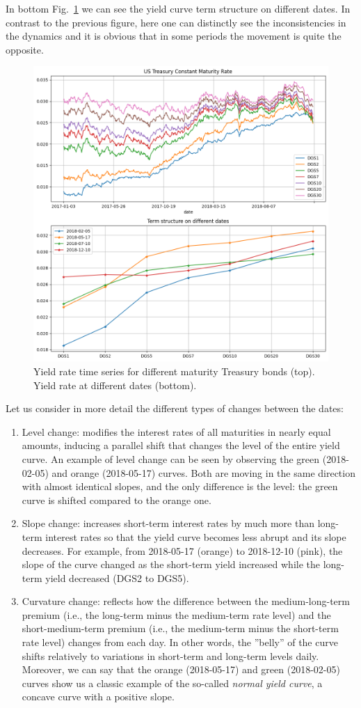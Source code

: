 In bottom Fig.~\ref{fig:yield_rate_ts} we can see the yield curve term structure on different dates. In contrast to the previous figure, here one can distinctly see the inconsistencies in the dynamics and it is obvious that in some periods the movement is quite the opposite.

\begin{figure}[htbp]
	\centering
	\includegraphics[width=0.7\linewidth]{figures/treasury_rate}
	\caption{Yield rate time series for different maturity Treasury bonds (top). Yield rate at different dates (bottom).}
	\label{fig:yield_rate_ts}
\end{figure}

Let us consider in more detail the different types of changes between the dates:
\begin{enumerate}
\item Level change: modifies the interest rates of all maturities in nearly equal amounts, inducing a parallel shift that changes the level of the entire yield curve. An example of level change can be seen by observing the green (2018-02-05) and orange (2018-05-17) curves. Both are moving in the same direction with almost identical slopes, and the only difference is the level: the green curve is shifted compared to the orange one.
\item Slope change: increases short-term interest rates by much more than long-term interest rates so that the yield curve becomes less abrupt and its slope decreases.
For example, from 2018-05-17 (orange) to 2018-12-10 (pink), the slope of the curve changed as the short-term yield increased while the long-term yield decreased (DGS2 to DGS5).
\item Curvature change: reflects how the difference between the medium-long-term premium (i.e., the long-term minus the medium-term rate level) and the short-medium-term premium (i.e., the medium-term minus the short-term rate level) changes from each day. In other words, the ”belly” of the curve shifts relatively to variations in short-term and long-term levels daily. Moreover, we can say that the orange (2018-05-17) and green (2018-02-05) curves show us a classic example of the so-called \emph{normal yield curve}, a concave curve with a positive slope.
\end{enumerate}

